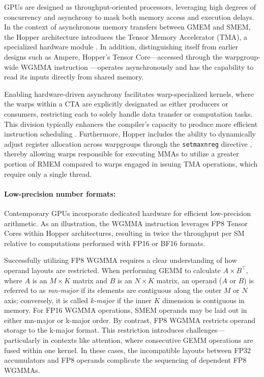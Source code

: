 GPUs are designed as throughput-oriented processors, leveraging high degrees of concurrency and asynchrony to mask both memory access and execution delays. In the context of asynchronous memory transfers between GMEM and SMEM, the Hopper architecture introduces the Tensor Memory Accelerator (TMA), a specialized hardware module \cite[\S7.29]{cuda}. In addition, distinguishing itself from earlier designs such as Ampere, Hopper's Tensor Core—accessed through the warpgroup-wide WGMMA instruction \cite[\S9.7.14]{ptx}—operates asynchronously and has the capability to read its inputs directly from shared memory.

Enabling hardware-driven asynchrony facilitates warp-specialized kernels, where the warps within a CTA are explicitly designated as either producers or consumers, restricting each to solely handle data transfer or computation tasks. This division typically enhances the compiler's capacity to produce more efficient instruction scheduling \citep{warp-specialization-2011}. Furthermore, Hopper includes the ability to dynamically adjust register allocation across warpgroups through the \verb|setmaxnreg| directive \cite[\S9.7.17.1]{ptx}, thereby allowing warps responsible for executing MMAs to utilize a greater portion of RMEM compared to warps engaged in issuing TMA operations, which require only a single thread.

\paragraph{Low-precision number formats:}
\label{sec:low-precision-gpu}
Contemporary GPUs incorporate dedicated hardware for efficient low-precision arithmetic. As an illustration, the WGMMA instruction leverages FP8 Tensor Cores within Hopper architectures, resulting in twice the throughput per SM relative to computations performed with FP16 or BF16 formats.

Successfully utilizing FP8 WGMMA requires a clear understanding of how operand layouts are restricted. When performing GEMM to calculate $A \times B^{\top}$, where $A$ is an $M\times K$ matrix and $B$ is an $N\times K$ matrix, an operand ($A$ or $B$) is referred to as \emph{mn-major} if its elements are contiguous along the outer $M$ or $N$ axis; conversely, it is called \emph{k-major} if the inner $K$ dimension is contiguous in memory. For FP16 WGMMA operations, SMEM operands may be laid out in either mn-major or k-major order. By contrast, FP8 WGMMA restricts operand storage to the k-major format. This restriction introduces challenges—particularly in contexts like attention, where consecutive GEMM operations are fused within one kernel. In these cases, the incompatible layouts between FP32 accumulators and FP8 operands complicate the sequencing of dependent FP8 WGMMAs.

